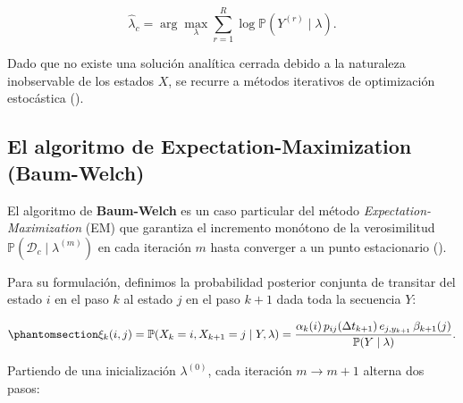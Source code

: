 \documentclass[
  spanish,
  us-letterpaper,
]{scrreprt}
\theoremstyle{definition}
\theoremstyle{remark}
\begin{document}
\[
\hat{\lambda}_c = \arg\max_{\lambda} \sum_{r=1}^{R} \log \mathbb{P}(Y^{(r)} \mid \lambda).
\]

Dado que no existe una solución analítica cerrada debido a la naturaleza
inobservable de los estados \(X\), se recurre a métodos iterativos de
optimización estocástica ().

\subsection{El algoritmo de Expectation-Maximization
(Baum-Welch)}\label{el-algoritmo-de-expectation-maximization-baum-welch}

El algoritmo de \textbf{Baum-Welch} es un caso particular del método
\emph{Expectation-Maximization} (EM) que garantiza el incremento
monótono de la verosimilitud
\(\mathbb{P}(\mathcal{D}_c \mid \lambda^{(m)})\) en cada iteración \(m\)
hasta converger a un punto estacionario
().

Para su formulación, definimos la probabilidad posterior conjunta de
transitar del estado \(i\) en el paso \(k\) al estado \(j\) en el paso
\(k+1\) dada toda la secuencia \(Y\):

\begin{equation}\phantomsection\label{eq-xi-transicion}{
\xi_k(i, j) = \mathbb{P}(X_k = i, X_{k+1} = j \mid Y, \lambda)
= \frac{\alpha_k(i)\, p_{ij}(\Delta t_{k+1})\, e_{j, y_{k+1}}\, \beta_{k+1}(j)}{\mathbb{P}(Y \mid \lambda)}.
}\end{equation}

Partiendo de una inicialización \(\lambda^{(0)}\), cada iteración
\(m \to m+1\) alterna dos pasos:
\end{document}
